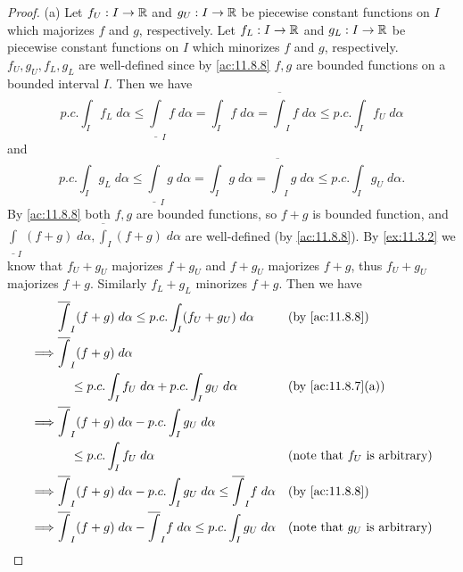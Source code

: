 \begin{proof}{(a)}
  Let \(f_U : I \to \mathbb{R}\) and \(g_U : I \to \mathbb{R}\) be piecewise constant functions on \(I\) which majorizes \(f\) and \(g\), respectively.
  Let \(f_L : I \to \mathbb{R}\) and \(g_L : I \to \mathbb{R}\) be piecewise constant functions on \(I\) which minorizes \(f\) and \(g\), respectively.
  \(f_U, g_U, f_L, g_L\) are well-defined since by \cref{ac:11.8.8} \(f, g\) are bounded functions on a bounded interval \(I\).
  Then we have
  \[
    p.c. \int_I f_L \; d \alpha \leq \underline{\int}_I f \; d \alpha = \int_I f \; d \alpha = \overline{\int}_I f \; d \alpha \leq p.c. \int_I f_U \; d \alpha
  \]
  and
  \[
    p.c. \int_I g_L \; d \alpha \leq \underline{\int}_I g \; d \alpha = \int_I g \; d \alpha = \overline{\int}_I g \; d \alpha \leq p.c. \int_I g_U \; d \alpha.
  \]
  By \cref{ac:11.8.8} both \(f, g\) are bounded functions, so \(f + g\) is bounded function, and \(\underline{\int}_I (f + g) \; d \alpha, \overline{\int}_I (f + g) \; d \alpha\) are well-defined (by \cref{ac:11.8.8}).
  By \cref{ex:11.3.2} we know that \(f_U + g_U\) majorizes \(f + g_U\) and \(f + g_U\) majorizes \(f + g\), thus \(f_U + g_U\) majorizes \(f + g\).
  Similarly \(f_L + g_L\) minorizes \(f + g\).
  Then we have
  \begin{align*}
             & \overline{\int}_I (f + g) \; d \alpha \leq p.c. \int_I (f_U + g_U) \; d \alpha                               &   & \text{(by \cref{ac:11.8.8})}            \\
    \implies & \overline{\int}_I (f + g) \; d \alpha                                                                                                                      \\
             & \quad \leq p.c. \int_I f_U \; d \alpha + p.c. \int_I g_U \; d \alpha                                         &   & \text{(by \cref{ac:11.8.7}(a))}         \\
    \implies & \overline{\int}_I (f + g) \; d \alpha - p.c. \int_I g_U \; d \alpha                                                                                        \\
             & \quad \leq p.c. \int_I f_U \; d \alpha                                                                       &   & \text{(note that \(f_U\) is arbitrary)} \\
    \implies & \overline{\int}_I (f + g) \; d \alpha - p.c. \int_I g_U \; d \alpha \leq \overline{\int}_I f \; d \alpha     &   & \text{(by \cref{ac:11.8.8})}            \\
    \implies & \overline{\int}_I (f + g) \; d \alpha - \overline{\int}_I f \; d \alpha \leq p.c. \int_I g_U \; d \alpha     &   & \text{(note that \(g_U\) is arbitrary)} \\

\end{align*}
\end{proof}
